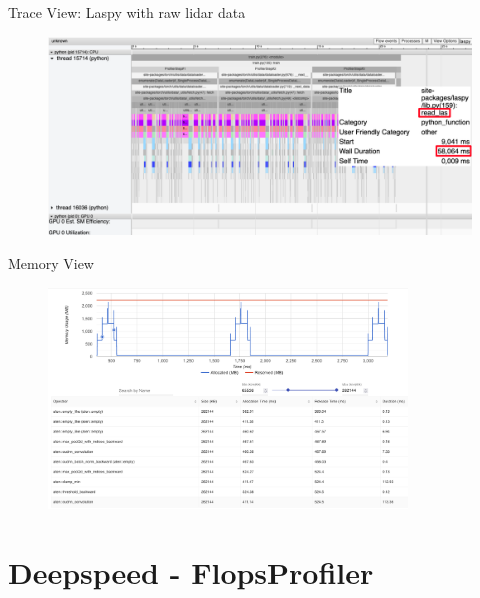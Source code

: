 \documentclass[compress,aspectratio=169]{beamer}
\begin{document}
\begin{frame}{Trace View: Laspy with raw lidar data}
    \vspace{-1em}
\begin{center}
    \begin{figure}
        \includegraphics[width=1\textwidth]{../../data/scap_gtx1080_profiler-torch_sample-points_14650750_trace-view-laspy}
    \end{figure}
    \end{center}
\end{frame}

\begin{frame}{Memory View}
    \vspace{-1em}
\begin{center}
    \begin{figure}
        \includegraphics[width=0.85\textwidth]{../../data/scap_gtx1080_profiler-torch_batch-size-64_14650758_memory-view}
    \end{figure}
    \end{center}
\end{frame}


\section{Deepspeed - FlopsProfiler}
\sectionIntro %
\end{document}
